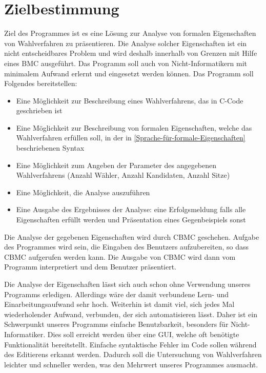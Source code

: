 \documentclass[a4paper]{scrreprt}
\begin{document}
\chapter{Zielbestimmung}
Ziel des Programmes ist es eine  Lösung zur Analyse von formalen Eigenschaften von Wahlverfahren zu präsentieren. Die Analyse solcher Eigenschaften ist ein nicht entscheidbares Problem und wird deshalb innerhalb von Grenzen mit Hilfe eines \ac{BMC} ausgeführt. Das Programm soll auch von Nicht-Informatikern mit minimalem Aufwand erlernt und eingesetzt werden können.
Das Programm soll Folgendes bereitstellen:
\begin{itemize}
\item Eine Möglichkeit zur Beschreibung eines Wahlverfahrens, das in C-Code geschrieben ist
\item Eine Möglichkeit zur Beschreibung von formalen Eigenschaften, welche das Wahlverfahren erfüllen soll, in der in \ref{Sprache-für-formale-Eigenschaften} beschriebenen Syntax
\item Eine Möglichkeit zum Angeben der Parameter des angegebenen Wahlverfahrens (Anzahl Wähler, Anzahl Kandidaten, Anzahl Sitze)
\item Eine Möglichkeit, die Analyse auszuführen
\item Eine Ausgabe des Ergebnisses der Analyse: eine Erfolgsmeldung falls alle Eigenschaften erfüllt werden und Präsentation eines Gegenbeispiels sonst
\end{itemize}

Die Analyse der gegebenen Eigenschaften wird durch \ac{CBMC} geschehen. Aufgabe des Programmes wird sein, die Eingaben des \gls{Benutzer}s aufzubereiten, so dass \ac{CBMC} aufgerufen werden kann. Die Ausgabe von \ac{CBMC} wird dann vom Programm interpretiert und dem Benutzer präsentiert. 

Die Analyse der Eigenschaften lässt sich auch schon ohne Verwendung unseres Programms erledigen. Allerdings wäre der damit verbundene Lern- und Einarbeitungsaufwand sehr hoch. Weiterhin ist damit viel, sich jedes Mal wiederholender Aufwand, verbunden, der sich automatisieren lässt. Daher ist ein Schwerpunkt unseres Programms einfache Benutzbarkeit, besonders für Nicht-Informatiker. Dies soll erreicht werden über eine \ac{GUI}, welche oft benötigte Funktionalität bereitstellt. Einfache syntaktische Fehler im Code sollen während des Editierens erkannt werden. Dadurch soll die Untersuchung von Wahlverfahren leichter und schneller werden, was den Mehrwert unseres Programmes ausmacht.
\end{document}
